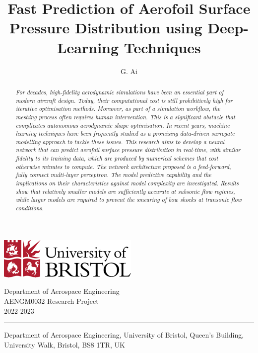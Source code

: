 \documentclass[11pt]{article}
\title{Fast Prediction of Aerofoil Surface Pressure Distribution using Deep-Learning Techniques}
\author{G. Ai}
\begin{document}
\thispagestyle{plain}

\vspace*{-2cm}

\begin{minipage}[t]{7cm}
\flushleft
\includegraphics{bristolLogo.png}
\end{minipage}
\hfill
\begin{minipage}[t]{7cm}
\flushright
\vspace*{-1cm}
Department of Aerospace Engineering\\
AENGM0032 Research Project\\
2022-2023
\end{minipage}

\vspace{11pt}
\hrule

\makeatletter
\begin{center}
	\vspace{11pt}
	\MakeUppercase{\textbf{\@title}}

	\@author

	Department of Aerospace Engineering, University of Bristol,
	Queen’s Building, University Walk, Bristol, BS8 1TR, UK
\end{center}
\makeatother

\begin{abstract}{\it
For decades, high-fidelity aerodynamic simulations have been an essential part of modern aircraft design. Today, their computational cost is still prohibitively high for iterative optimisation methods. Moreover, as part of a simulation workflow, the meshing process often requires human intervention. This is a significant obstacle that complicates autonomous aerodynamic shape optimisation. In recent years, machine learning techniques have been frequently studied as a promising data-driven surrogate modelling approach to tackle these issues. This research aims to develop a neural network that can predict aerofoil surface pressure distribution in real-time, with similar fidelity to its training data, which are produced by numerical schemes that cost otherwise minutes to compute. The network architecture proposed is a feed-forward, fully connect multi-layer perceptron. The model predictive capability and the implications on their characteristics against model complexity are investigated. Results show that relatively smaller models are sufficiently accurate at subsonic flow regimes, while larger models are required to prevent the smearing of bow shocks at transonic flow conditions.
}\end{abstract}
\end{document}
